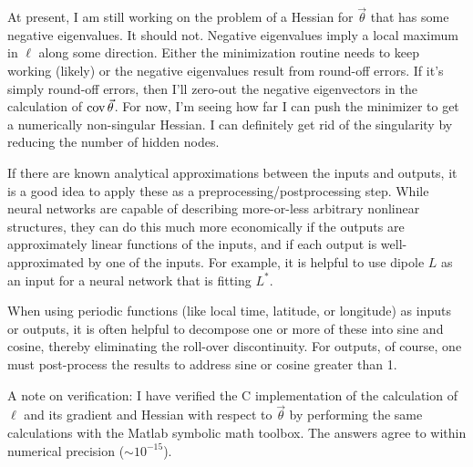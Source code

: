 \documentclass{article}    %
\newcommand{\cov}{\mathop{{\rm cov}}}
\begin{document}
At present, I am still working on the problem of a Hessian for
$\vec\theta$ that has some negative eigenvalues. It should not.
Negative eigenvalues imply a local maximum in $\ell$ along some
direction. Either the minimization routine needs to keep working
(likely) or the negative eigenvalues result from round-off errors. If
it's simply round-off errors, then I'll zero-out the negative
eigenvectors in the calculation of $\cov\vec\theta$. For now, I'm
seeing how far I can push the minimizer to get a numerically
non-singular Hessian. I can definitely get rid of the singularity by
reducing the number of hidden nodes.

If there are known analytical approximations between the inputs and
outputs, it is a good idea to apply these as a
preprocessing/postprocessing step. While neural networks are capable
of describing more-or-less arbitrary nonlinear structures, they can do
this much more economically if the outputs are approximately linear
functions of the inputs, and if each output is well-approximated by
one of the inputs. For example, it is helpful to use dipole $L$ as an
input for a neural network that is fitting $L^*$.

When using periodic functions (like local time, latitude, or
longitude) as inputs or outputs, it is often helpful to decompose one
or more of these into sine and cosine, thereby eliminating the
roll-over discontinuity. For outputs, of course, one must post-process
the results to address sine or cosine greater than 1.

A note on verification: I have verified the C implementation of the
calculation of $\ell$ and its gradient and Hessian with respect to
$\vec\theta$ by performing the same calculations with the Matlab
symbolic math toolbox. The answers agree to within numerical precision
($\sim 10^{-15}$).
\end{document}
